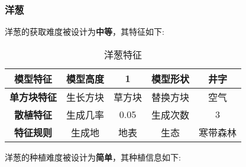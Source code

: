 \subsubsection{洋葱}

洋葱的获取难度被设计为\textbf{中等}，其特征如下:
\begin{table}[H]
    \centering
    \caption{洋葱特征}
    \label{table:洋葱特征}
    \setlength{\tabcolsep}{4mm}
    \begin{tabular}{c|cc|cc}
        \toprule
        \textbf{模型特征}   & 模型高度 & 1      & 模型形状 & 井字     \\
        \midrule
        \textbf{单方块特征} & 生长方块 & 草方块 & 替换方块 & 空气     \\
        \midrule
        \textbf{散植特征}   & 生成几率 & 0.05   & 生成次数 & 3        \\
        \midrule
        \textbf{特征规则}   & 生成地   & 地表   & 生态     & 寒带森林 \\
        \bottomrule
    \end{tabular}
\end{table}


洋葱的种植难度被设计为\textbf{简单}，其种植信息如下:

